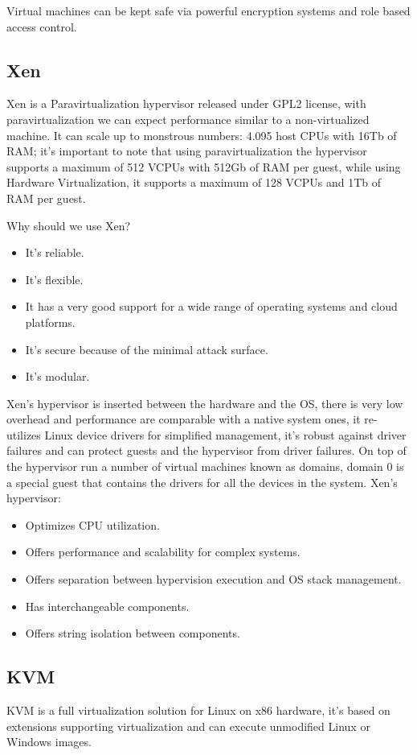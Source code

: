 Virtual machines can be kept safe via powerful encryption systems and role based access control.
\subsection{Xen}
Xen is a Paravirtualization hypervisor released under GPL2 license, with paravirtualization we can expect performance similar to a non-virtualized machine. It can scale up to monstrous numbers: 4.095 host CPUs with 16Tb of RAM; it's important to note that using paravirtualization the hypervisor supports a maximum of 512 VCPUs with 512Gb of RAM per guest, while using Hardware Virtualization, it supports a maximum of 128 VCPUs and 1Tb of RAM per guest.

Why should we use Xen?
\begin{itemize}
    \item It's reliable.
    \item It's flexible.
    \item It has a very good support for a wide range of operating systems and cloud platforms.
    \item It's secure because of the minimal attack surface.
    \item It's modular.
\end{itemize}
Xen's hypervisor is inserted between the hardware and the OS, there is very low overhead and performance are comparable with a native system ones, it re-utilizes Linux device drivers for simplified management, it's robust against driver failures and can protect guests and the hypervisor from driver failures. On top of the hypervisor run a number of virtual machines known as domains, domain 0 is a special guest that contains the drivers for all the devices in the system. Xen's hypervisor:
\begin{itemize}
    \item Optimizes CPU utilization.
    \item Offers performance and scalability for complex systems.
    \item Offers separation between hypervision execution and OS stack management.
    \item Has interchangeable components.
    \item Offers string isolation between components.
\end{itemize} 
\subsection{KVM}
KVM is a full virtualization solution for Linux on x86 hardware, it's based on extensions supporting virtualization and can execute unmodified Linux or Windows images.

